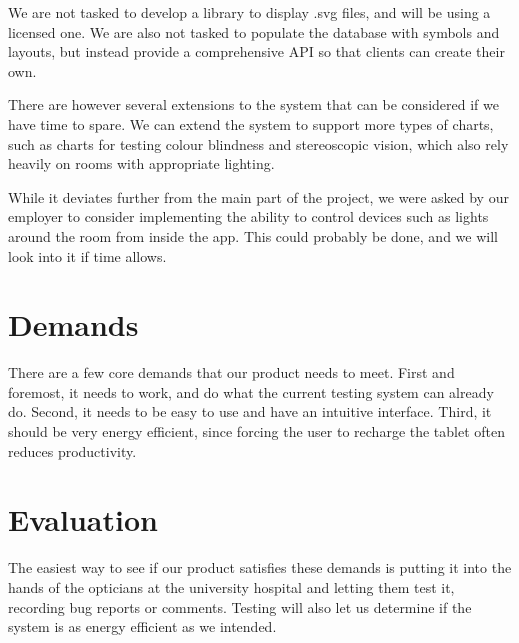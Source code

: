 \documentclass[12pt,a4paper,notitlepage]{report}
\begin{document}
We are not tasked to develop a library to display .svg files, and will be using a licensed one. We are also not tasked to populate the database with symbols and layouts, but instead provide a comprehensive API so that clients can create their own.


There are however several extensions to the system that can be considered if we have time to spare. We can extend the system to support more types of charts, such as charts for testing colour blindness and stereoscopic vision, which also rely heavily on rooms with appropriate lighting.

While it deviates further from the main part of the project, we were asked by our employer to consider implementing the ability to control devices such as lights around the room from inside the app. This could probably be done, and we will look into it if time allows.

\section{Demands}

There are a few core demands that our product needs to meet. First and foremost, it needs to work, and do what the current testing system can already do. Second, it needs to be easy to use and have an intuitive interface. Third, it should be very energy efficient, since forcing the user to recharge the tablet often reduces productivity. 

\section{Evaluation}

The easiest way to see if our product satisfies these demands is putting it into the hands of the opticians at the university hospital and letting them test it, recording bug reports or comments. Testing will also let us determine if the system is as energy efficient as we intended.
\end{document}
